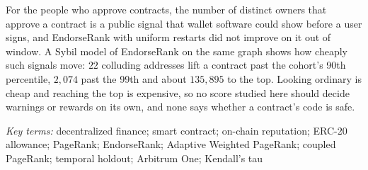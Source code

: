 For the people who approve contracts, the number of distinct owners that approve a contract is a public signal that wallet software could show before a user signs, and EndorseRank with uniform restarts did not improve on it out of window. A Sybil model of EndorseRank on the same graph shows how cheaply such signals move: $22$ colluding addresses lift a contract past the cohort's 90th percentile, $2{,}074$ past the 99th and about $135{,}895$ to the top. Looking ordinary is cheap and reaching the top is expensive, so no score studied here should decide warnings or rewards on its own, and none says whether a contract's code is safe.

\emph{Key terms:} decentralized finance; smart contract; on-chain reputation; ERC-20 allowance; PageRank; EndorseRank; Adaptive Weighted PageRank; coupled PageRank; temporal holdout; Arbitrum One; Kendall's tau

